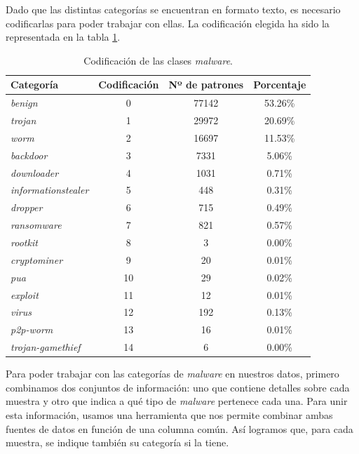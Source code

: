 Dado que las distintas categorías se encuentran en formato texto, es necesario codificarlas para poder trabajar con ellas. La codificación elegida ha sido la representada en la tabla \ref{tabla:codificacion_malware}.

\vspace{1em}

\begin{table}[th]
	\centering
	\begin{tabular}{ |m{4cm}|c|c|c| }
		\hline
		\rowcolor{LightCyan}
		Categoría                   & Codificación & Nº de patrones & Porcentaje \\
		\hline
		\textit{benign}             & 0  & 77142 & 53.26\% \\
		\textit{trojan}             & 1  & 29972 & 20.69\% \\
		\textit{worm}               & 2  & 16697 & 11.53\% \\
		\textit{backdoor}           & 3  & 7331  & 5.06\% \\
		\textit{downloader}         & 4  & 1031  & 0.71\% \\
		\textit{informationstealer} & 5  & 448   & 0.31\% \\
		\textit{dropper}            & 6  & 715   & 0.49\% \\
		\textit{ransomware}         & 7  & 821   & 0.57\% \\
		\textit{rootkit}            & 8  & 3     & 0.00\% \\
		\textit{cryptominer}        & 9  & 20    & 0.01\% \\
		\textit{pua}                & 10 & 29    & 0.02\% \\
		\textit{exploit}            & 11 & 12    & 0.01\% \\
		\textit{virus}              & 12 & 192   & 0.13\% \\
		\textit{p2p-worm}           & 13 & 16    & 0.01\% \\
		\textit{trojan-gamethief}   & 14 & 6     & 0.00\% \\
		\hline
	\end{tabular}
	\caption{Codificación de las clases \textit{malware}.}
	\label{tabla:codificacion_malware}
\end{table}

\newpage
Para poder trabajar con las categorías de \textit{malware} en nuestros datos, primero combinamos dos conjuntos de información: uno que contiene detalles sobre cada muestra y otro que indica a qué tipo de \textit{malware} pertenece cada una. Para unir esta información, usamos una herramienta que nos permite combinar ambas fuentes de datos en función de una columna común. Así logramos que, para cada muestra, se indique también su categoría si la tiene.

